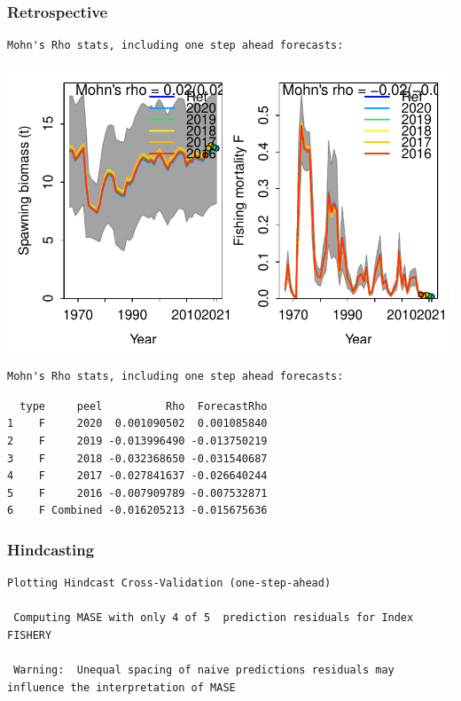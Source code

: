 \documentclass[
  letterpaper,
  DIV=11,
  numbers=noendperiod]{scrartcl}
\begin{document}
\hypertarget{retrospective}{%
\subsubsection{Retrospective}\label{retrospective}}

\begin{verbatim}
Mohn's Rho stats, including one step ahead forecasts:
\end{verbatim}

\includegraphics{LUKA_50_Base_model_diags_report_files/figure-pdf/retrospectives-1.pdf}

\begin{verbatim}
Mohn's Rho stats, including one step ahead forecasts:
\end{verbatim}

\begin{verbatim}
  type     peel          Rho  ForecastRho
1    F     2020  0.001090502  0.001085840
2    F     2019 -0.013996490 -0.013750219
3    F     2018 -0.032368650 -0.031540687
4    F     2017 -0.027841637 -0.026640244
5    F     2016 -0.007909789 -0.007532871
6    F Combined -0.016205213 -0.015675636
\end{verbatim}

\hypertarget{hindcasting}{%
\subsubsection{Hindcasting}\label{hindcasting}}

\begin{verbatim}
Plotting Hindcast Cross-Validation (one-step-ahead) 

 Computing MASE with only 4 of 5  prediction residuals for Index FISHERY 

 Warning:  Unequal spacing of naive predictions residuals may influence the interpretation of MASE 
\end{verbatim}
\end{document}
